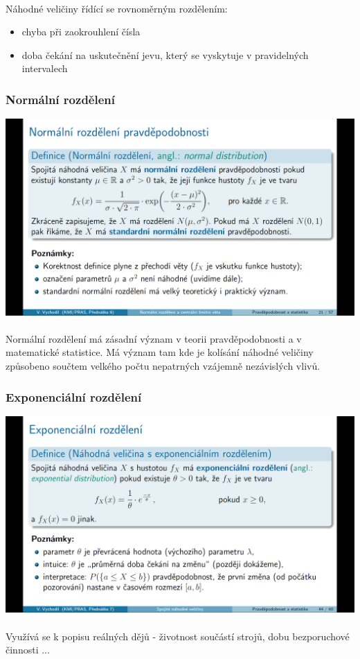 \documentclass[12pt,a4paper]{article}
\begin{document}
\paragraph{} Náhodné veličiny řídící se rovnoměrným rozdělením: \begin{itemize}
	\item chyba při zaokrouhlení čísla
	\item doba čekání na uskutečnění jevu, který se vyskytuje v pravidelných intervalech
\end{itemize}
\subsubsection{Normální rozdělení}
\begin{center}
	\includegraphics[scale=0.32]{img/spojite_rozdeleni_normalni}
\end{center}
\paragraph{} Normální rozdělení má zásadní význam v teorii pravděpodobnosti a v matematické statistice. Má význam tam kde je kolísání náhodné veličiny způsobeno součtem velkého počtu nepatrných vzájemně nezávislých vlivů.

\subsubsection{Exponenciální rozdělení}
\begin{center}
	\includegraphics[scale=0.32]{img/spojite_rozdeleni_exponencialni}
\end{center}
\paragraph{} Využívá se k popisu reálných dějů - životnost součástí strojů, dobu bezporuchové činnosti ...
\end{document}
